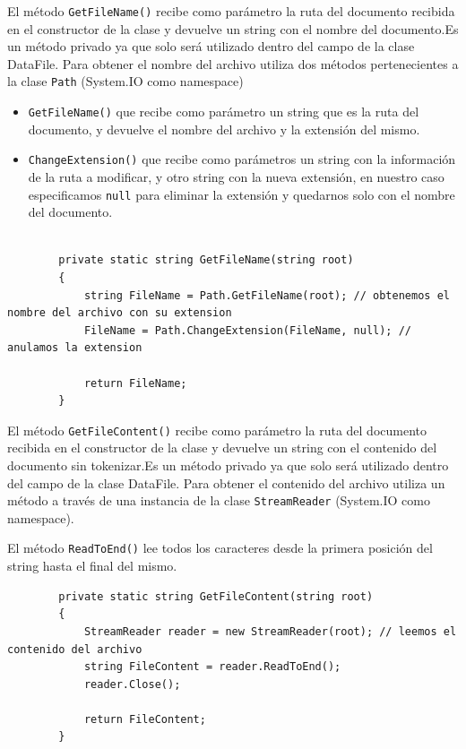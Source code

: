 \documentclass[12pt,a4paper]{report}
\begin{document}
El método \texttt{GetFileName()} recibe como parámetro la ruta del documento recibida en el constructor de la clase y devuelve un string con el nombre del documento.Es un método privado ya que solo será utilizado dentro del campo de la clase DataFile. Para obtener el nombre del archivo utiliza dos métodos pertenecientes a la clase \texttt{Path} (System.IO como namespace)
\begin{itemize}
\item \texttt{GetFileName()} que recibe como parámetro un string que es la ruta del documento, y devuelve el nombre del archivo y la extensión del mismo.
\item \texttt{ChangeExtension()} que recibe como parámetros un string con la información de la ruta a modificar, y otro string con la nueva extensión, en nuestro caso especificamos \texttt{null} para eliminar la extensión y quedarnos solo con el nombre del documento.
\end{itemize}

\begin{lstlisting}

        private static string GetFileName(string root)
        {
            string FileName = Path.GetFileName(root); // obtenemos el nombre del archivo con su extension
            FileName = Path.ChangeExtension(FileName, null); // anulamos la extension
            
            return FileName;
        }

\end{lstlisting}\bigskip

El método \texttt{GetFileContent()} recibe como parámetro la ruta del documento recibida en el constructor de la clase y devuelve un string con el contenido del documento sin tokenizar.Es un método privado ya que solo será utilizado dentro del campo de la clase DataFile. Para obtener el contenido del archivo utiliza un método a través de una instancia de la clase \texttt{StreamReader} (System.IO como namespace).\par
El método \texttt{ReadToEnd()} lee todos los caracteres desde la primera posición del string hasta el final del mismo.

\begin{lstlisting}
        private static string GetFileContent(string root)
        {
            StreamReader reader = new StreamReader(root); // leemos el contenido del archivo
            string FileContent = reader.ReadToEnd();
            reader.Close(); 

            return FileContent;
        }
\end{lstlisting}\bigskip
\end{document}
